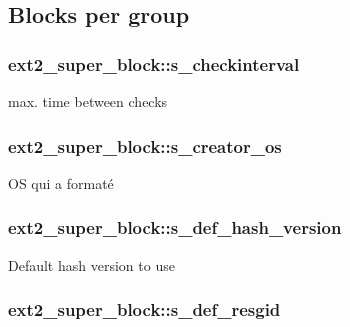 \subsection*{Blocks per group}\hypertarget{structext2__super__block_a41729c3eb872813abe1489de88e6f736}{
\subsubsection[{s\+\_\+checkinterval}]{ ext2\+\_\+super\+\_\+block\+::s\+\_\+checkinterval}}\label{structext2__super__block_a41729c3eb872813abe1489de88e6f736}
max. time between checks \hypertarget{structext2__super__block_a421f09691aa0911da60db7ef23dc30ca}{
\subsubsection[{s\+\_\+creator\+\_\+os}]{ ext2\+\_\+super\+\_\+block\+::s\+\_\+creator\+\_\+os}}\label{structext2__super__block_a421f09691aa0911da60db7ef23dc30ca}
O\+S qui a formaté \hypertarget{structext2__super__block_a3120768bf3ac685a2e5d38d84ec3c5b8}{
\subsubsection[{s\+\_\+def\+\_\+hash\+\_\+version}]{ ext2\+\_\+super\+\_\+block\+::s\+\_\+def\+\_\+hash\+\_\+version}}\label{structext2__super__block_a3120768bf3ac685a2e5d38d84ec3c5b8}
Default hash version to use \hypertarget{structext2__super__block_a2973f6cda59f008e1f649c6d68ddafd6}{
\subsubsection[{s\+\_\+def\+\_\+resgid}]{ ext2\+\_\+super\+\_\+block\+::s\+\_\+def\+\_\+resgid}}\label{structext2__super__block_a2973f6cda59f008e1f649c6d68ddafd6}
